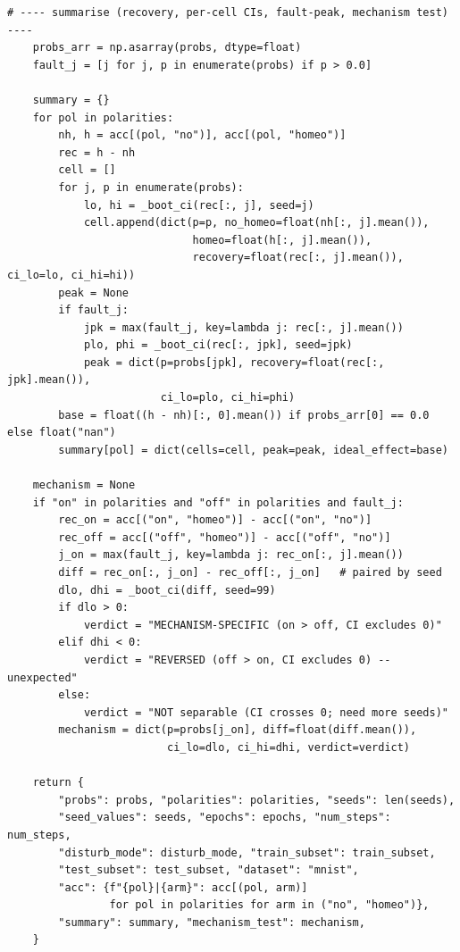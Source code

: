 \begin{lstlisting}[caption={mnn\_torch/training.py},label={lst:mnn-src-training}]
    # ---- summarise (recovery, per-cell CIs, fault-peak, mechanism test) ----
    probs_arr = np.asarray(probs, dtype=float)
    fault_j = [j for j, p in enumerate(probs) if p > 0.0]

    summary = {}
    for pol in polarities:
        nh, h = acc[(pol, "no")], acc[(pol, "homeo")]
        rec = h - nh
        cell = []
        for j, p in enumerate(probs):
            lo, hi = _boot_ci(rec[:, j], seed=j)
            cell.append(dict(p=p, no_homeo=float(nh[:, j].mean()),
                             homeo=float(h[:, j].mean()),
                             recovery=float(rec[:, j].mean()), ci_lo=lo, ci_hi=hi))
        peak = None
        if fault_j:
            jpk = max(fault_j, key=lambda j: rec[:, j].mean())
            plo, phi = _boot_ci(rec[:, jpk], seed=jpk)
            peak = dict(p=probs[jpk], recovery=float(rec[:, jpk].mean()),
                        ci_lo=plo, ci_hi=phi)
        base = float((h - nh)[:, 0].mean()) if probs_arr[0] == 0.0 else float("nan")
        summary[pol] = dict(cells=cell, peak=peak, ideal_effect=base)

    mechanism = None
    if "on" in polarities and "off" in polarities and fault_j:
        rec_on = acc[("on", "homeo")] - acc[("on", "no")]
        rec_off = acc[("off", "homeo")] - acc[("off", "no")]
        j_on = max(fault_j, key=lambda j: rec_on[:, j].mean())
        diff = rec_on[:, j_on] - rec_off[:, j_on]   # paired by seed
        dlo, dhi = _boot_ci(diff, seed=99)
        if dlo > 0:
            verdict = "MECHANISM-SPECIFIC (on > off, CI excludes 0)"
        elif dhi < 0:
            verdict = "REVERSED (off > on, CI excludes 0) -- unexpected"
        else:
            verdict = "NOT separable (CI crosses 0; need more seeds)"
        mechanism = dict(p=probs[j_on], diff=float(diff.mean()),
                         ci_lo=dlo, ci_hi=dhi, verdict=verdict)

    return {
        "probs": probs, "polarities": polarities, "seeds": len(seeds),
        "seed_values": seeds, "epochs": epochs, "num_steps": num_steps,
        "disturb_mode": disturb_mode, "train_subset": train_subset,
        "test_subset": test_subset, "dataset": "mnist",
        "acc": {f"{pol}|{arm}": acc[(pol, arm)]
                for pol in polarities for arm in ("no", "homeo")},
        "summary": summary, "mechanism_test": mechanism,
    }



\end{lstlisting}
